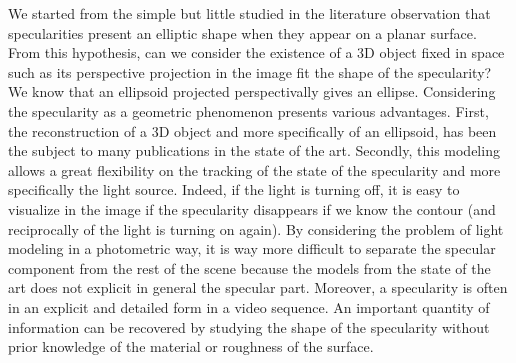 
We started from the simple but little studied in the literature observation that specularities present an elliptic shape when they appear on a planar surface. From this hypothesis, can we consider the existence of a 3D object fixed in space such as its perspective projection in the image fit the shape of the specularity? We know that an ellipsoid projected perspectivally gives an ellipse. Considering the specularity as a geometric phenomenon presents various advantages. First, the reconstruction of a 3D object and more specifically of an ellipsoid, has been the subject to many publications in the state of the art.
Secondly, this modeling allows a great flexibility on the tracking of the state of the specularity and more specifically the light source. Indeed, if the light is turning off, it is easy to visualize in the image if the specularity disappears if we know the contour (and reciprocally of the light is turning on again). By considering the problem of light modeling in a photometric way, it is way more difficult to separate the specular component from the rest of the scene because the models from the state of the art does not explicit in general the specular part. Moreover, a specularity is often in an explicit and detailed form in a video sequence. An important quantity of information can be recovered by studying the shape of the specularity without prior knowledge of the material or roughness of the surface.

